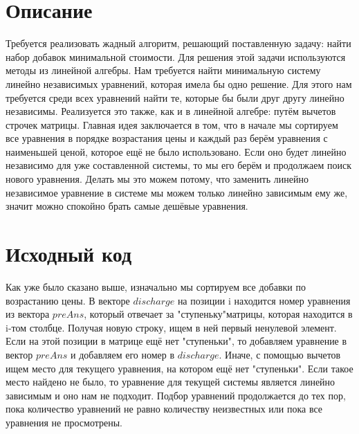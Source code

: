 \section{Описание}
Требуется реализовать жадный алгоритм, решающий поставленную задачу: найти набор добавок минимальной стоимости. Для решения этой задачи используются методы из линейной алгебры. Нам требуется найти минимальную систему линейно независимых уравнений, которая имела бы одно решение. Для этого нам требуется среди всех уравнений найти те, которые бы были друг другу линейно независимы. Реализуется это также, как и в линейной алгебре: путём вычетов строчек матрицы. Главная идея заключается в том, что в начале мы сортируем все уравнения в порядке возрастания цены и каждый раз берём уравнения с наименьшей ценой, которое ещё не было использовано. Если оно будет линейно независимо для уже составленной системы, то мы его берём и продолжаем поиск нового уравнения. Делать мы это можем потому, что заменить линейно независимое уравнение в системе мы можем только линейно зависимым ему же, значит можно спокойно брать самые дешёвые уравнения.

\pagebreak

\section{Исходный код}
Как уже было сказано выше, изначально мы сортируем все добавки по возрастанию цены. В векторе $discharge$ на позиции i находится номер уравнения из вектора $preAns$, который отвечает за "ступеньку"\;матрицы, которая находится в i-том столбце. Получая новую строку, ищем в ней первый ненулевой элемент. Если на этой позиции в матрице ещё нет "ступеньки"\;, то добавляем уравнение в вектор $preAns$ и добавляем его номер в $discharge$. Иначе, с помощью вычетов ищем место для текущего уравнения, на котором ещё нет "ступеньки". Если такое место найдено не было, то уравнение для текущей системы является линейно зависимым и оно нам не подходит. Подбор уравнений продолжается до тех пор, пока количество уравнений не равно количеству неизвестных или пока все уравнения не просмотрены. 

